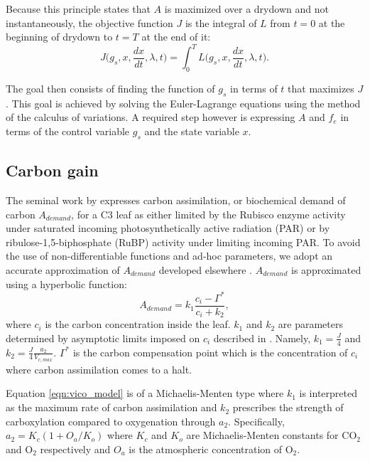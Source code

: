\documentclass[utf8]{frontiersSCNS} %
\begin{document}
Because this principle states that $A$ is maximized over a drydown and not instantaneously, the objective function $J$ is the integral of $L$ from $t=0$ at the beginning of drydown to $t=T$ at the end of it:
\begin{equation}
    \label{eqn:Objective}
    J\Big(g_s, x, \frac{dx}{dt}, \lambda, t\Big) = \int_0^T L\Big(g_s, x, \frac{dx}{dt}, \lambda, t\Big).
\end{equation}

The goal then consists of finding the function of $g_s$ in terms of $t$ that maximizes $J$. This goal is achieved by solving the Euler-Lagrange equations using the method of the calculus of variations. A required step however is expressing $A$ and $f_e$ in terms of the control variable $g_s$ and the state variable $x$.

\subsection{Carbon gain}

The seminal work by \citet{Farquhar1980} expresses carbon assimilation, or biochemical demand of carbon $A_{demand}$, for a C3 leaf as either limited by the Rubisco enzyme activity under saturated incoming photosynthetically active radiation (PAR) or by ribulose-1,5-biphosphate (RuBP) activity under limiting incoming PAR. 
To avoid the use of non-differentiable functions and ad-hoc parameters, we adopt an accurate approximation of $A_{demand}$ developed elsewhere \citep{Vico2013}. $A_{demand}$ is approximated using a hyperbolic function:
\begin{equation}
    \label{eqn:vico_model}
    A_{demand} = k_1 \frac{c_i - \Gamma^*}{c_i + k_2},
\end{equation}
where $c_i$ is the carbon concentration inside the leaf. $k_1$ and $k_2$ are parameters determined by asymptotic limits imposed on $c_i$ described in \citet{Vico2013}. Namely, $k_1 = \frac{J}{4}$ and $k_2 = \frac{J}{4} \frac{a_2}{V_{c,max}}$. $\Gamma^*$ is the carbon compensation point which is the concentration of $c_i$ where carbon assimilation comes to a halt.

Equation \ref{eqn:vico_model} is of a Michaelis-Menten type where $k_1$ is interpreted as the maximum rate of carbon assimilation and $k_2$ prescribes the strength of carboxylation compared to oxygenation through $a_2$. Specifically, $a_2 = K_c (1+O_a/K_o)$ where $K_c$ and $K_o$ are Michaelis-Menten constants for CO$_2$ and O$_2$ respectively and $O_a$ is the atmospheric concentration of O$_2$.
\end{document}
